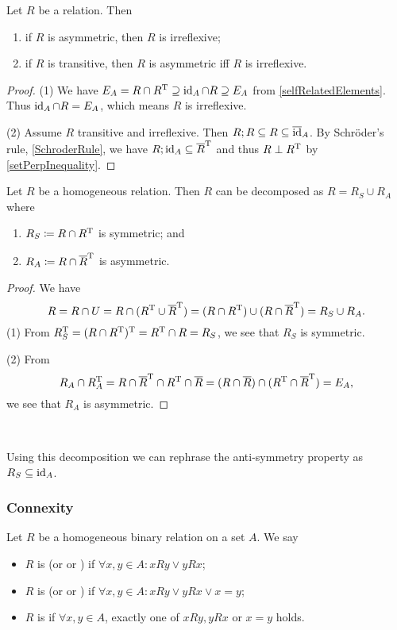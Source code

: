 \begin{lemma} \label{asymmetricIrreflexive}
Let $R$ be a relation. Then
\begin{enumerate}
\item if $R$ is asymmetric, then $R$ is irreflexive;
\item if $R$ is transitive, then $R$ is asymmetric iff $R$ is irreflexive.
\end{enumerate}
\end{lemma}
\begin{proof}
(1) We have $E_A = R \cap R^{\mathrm{T}} \supseteq \operatorname{id}_A\cap R \supseteq E_A$ from \ref{selfRelatedElements}. Thus $\operatorname{id}_A\cap R = E_A$, which means $R$ is irreflexive.

(2) Assume $R$ transitive and irreflexive. Then $R;R \subseteq R \subseteq \overline{\operatorname{id}}_A$. By Schröder's rule, \ref{SchroderRule}, we have $R;\operatorname{id}_A \subseteq \overline{R}^{\mathrm{T}}$ and thus $R\perp R^{\mathrm{T}}$ by \ref{setPerpInequality}.
\end{proof}

\begin{proposition} \label{symmetricAsymmetricDecomposition}
Let $R$ be a homogeneous relation. Then $R$ can be decomposed as $R = R_S \cup R_A$ where
\begin{enumerate}
\item $R_S \coloneqq R \cap R^{\mathrm{T}}$ is symmetric; and
\item $R_A \coloneqq R \cap \overline{R}^{\mathrm{T}}$ is asymmetric.
\end{enumerate}
\end{proposition}
\begin{proof}
We have
\[ R = R\cap U = R\cap (R^{\mathrm{T}} \cup \overline{R}^{\mathrm{T}}) = (R \cap R^{\mathrm{T}}) \cup (R \cap \overline{R}^{\mathrm{T}}) = R_S \cup R_A. \]
(1) From $R_S^{\mathrm{T}} = (R \cap R^{\mathrm{T}})^{\mathrm{T}} = R^{\mathrm{T}} \cap R = R_S$, we see that $R_S$ is symmetric.

(2) From
\[ R_A \cap R_A^{\mathrm{T}} = R \cap \overline{R}^{\mathrm{T}} \cap R^{\mathrm{T}} \cap \overline{R} = (R \cap \overline{R}) \cap (R^{\mathrm{T}} \cap \overline{R}^{\mathrm{T}}) = E_A, \]
we see that $R_A$ is asymmetric.
\end{proof}\

Using this decomposition we can rephrase the anti-symmetry property as $R_S \subseteq \operatorname{id}_A$.

\subsubsection{Connexity}
\begin{definition}
Let $R$ be a homogeneous binary relation on a set $A$. We say
\begin{itemize}
\item $R$ is  (or  or ) if $\forall x,y\in A: xRy \lor yRx$;
\item $R$ is  (or  or ) if $\forall x,y\in A: xRy \lor yRx \lor x=y$;
\item $R$ is  if $\forall x,y\in A$, exactly one of $xRy, yRx$ or $x=y$ holds.
\end{itemize}
\end{definition}

